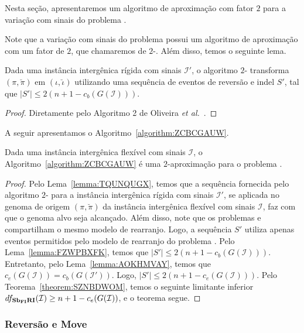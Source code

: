 Nesta seção, apresentaremos um algoritmo de aproximação com fator $2$ para a variação com sinais do problema \SbFIRI{}. 

Note que a variação com sinais do problema \SbIRI{} possui um algoritmo de aproximação com um fator de $2$, que chamaremos de $2$-\SbIRI{}. Além disso, temos o seguinte lema.

\begin{lemma}\label{lemma:FZWPBXFK}
Dada uma instância intergênica rígida com sinais $\mathcal{I}'$, o algoritmo $2$-\SbIRI{} transforma $(\pi,\breve\pi)$ em $(\iota,\breve\iota)$ utilizando uma sequência de eventos de reversão e indel $S'$, tal que $|S'| \le 2({n+1} - c_b(G(\mathcal{I})))$.
\end{lemma}
\begin{proof}
Diretamente pelo Algoritmo 2 de Oliveira \textit{et al.}~\cite{2021b-oliveira-etal}.
\end{proof}

A seguir apresentamos o Algoritmo~\ref{algorithm:ZCBCGAUW}.



\begin{theorem}\label{theorem:UEOFTCVZ}
Dada uma instância intergênica flexível com sinais $\mathcal{I}$, o Algoritmo~\ref{algorithm:ZCBCGAUW} é uma $2$-aproximação para o problema \SbFIRI{}.
\end{theorem}
\begin{proof}
Pelo Lema~\ref{lemma:TQUNQUGX}, temos que a sequência fornecida pelo algoritmo $2$-\SbIRI{} para a instância intergênica rígida com sinais $\mathcal{I'}$, se aplicada no genoma de origem $(\pi,\breve\pi)$ da instância intergênica flexível com sinais $\mathcal{I}$, faz com que o genoma alvo seja alcançado. Além disso, note que os problemas \SbIRI{} e \SbFIRI{} compartilham o mesmo modelo de rearranjo. Logo, a sequência $S'$ utiliza apenas eventos permitidos pelo modelo de rearranjo do problema \SbFIRI{}. Pelo Lema~\ref{lemma:FZWPBXFK}, temos que $|S'| \le 2({n+1} - c_b(G(\mathcal{I})))$. Entretanto, pelo Lema~\ref{lemma:AOKHMVAY}, temos que $c_e(G(\mathcal{I})) = c_b(G(\mathcal{I}'))$. Logo, $|S'| \le 2({n+1} - c_e(G(\mathcal{I})))$. Pelo Teorema~\ref{theorem:SZNBDWOM}, temos o seguinte limitante inferior $df_{\textbf{Sb\textsubscript{FI}RI}}(\mathcal{I}) \ge {n+1} - c_e(G(\mathcal{I}))$, e o teorema segue.
\end{proof}

\subsubsection{Reversão e Move}


